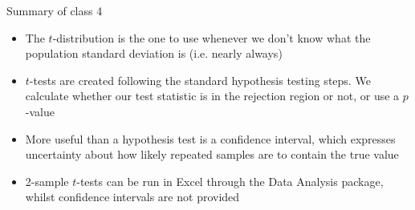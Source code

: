 \documentclass[12pt,xcolor=dvipsnames,handout,mathserif,aspectratio=169]{beamer}
\begin{document}
\begin{frame}{Summary of class 4}
\begin{itemize}
\item The $t$-distribution is the one to use whenever we don't know what the population standard deviation is (i.e. nearly always)
\item $t$-tests are created following the standard hypothesis testing steps. We calculate whether our test statistic is in the rejection region or not, or use a $p$-value
\item More useful than a hypothesis test is a confidence interval, which expresses uncertainty about how likely repeated samples are to contain the true value
\item 2-sample $t$-tests can be run in Excel through the Data Analysis package, whilst confidence intervals are not provided
\end{itemize}
\end{frame}
\end{document}
